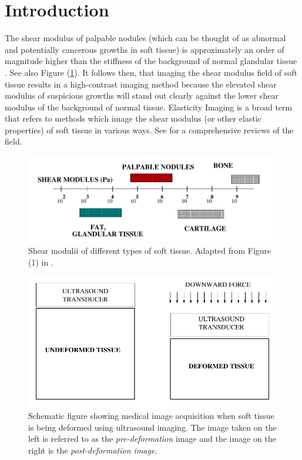 \documentclass[12pt]{article}
\begin{document}
\section{Introduction}
The shear modulus of palpable nodules (which can be thought of as abnormal and potentially cancerous growths in soft tissue) is approximately an order of magnitude higher than the stiffness of the background of normal glandular tissue \cite{paper:sarv1998}. See also Figure (\ref{fig:shearmod}). It follows then, that imaging the shear modulus field of soft tissue results in a high-contrast imaging method because the elevated shear modulus of suspicious growths will stand out clearly against the lower shear modulus of the background of normal tissue. Elasticity Imaging is a broad term that refers to methods which image the shear modulus (or other elastic properties) of soft tissue in various ways. See \cite{paper:gao1996,paper:parker2010,book:alamgarra2019,bookchap:oberaibarbone2019} for a comprehensive reviews of the field.
%
\begin{figure}[h]
   \centering
    \includegraphics[totalheight=3cm]{Figures/shearmod.png}
  \caption{\label{fig:shearmod} Shear modulii of different types of soft tissue. Adapted from Figure (1) in \cite{paper:sarv1998}.}
\end{figure}
%
\begin{figure}[h]
   \centering
    \includegraphics[totalheight=5cm]{Figures/prepostimage.png}
  \caption{\label{fig:prepostimage} Schematic figure showing medical image acquisition when soft tissue is being deformed using ultrasound imaging. The image taken on the left is referred to as the \textit{pre-deformation} image and the image on the right is the \textit{post-deformation image}.}
\end{figure}
%
\end{document}

